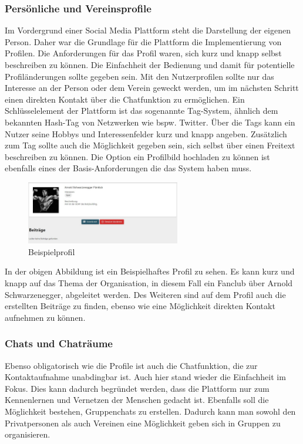 \subsubsection{Persönliche und Vereinsprofile}
\label{sec:abgeleitetefeatures}
Im Vordergrund einer Social Media Plattform steht die Darstellung der eigenen Person. Daher war die Grundlage für die Plattform die Implementierung von Profilen.
Die Anforderungen für das Profil waren, sich kurz und knapp selbst beschreiben zu können. Die Einfachheit der Bedienung und damit für potentielle Profiländerungen sollte gegeben sein. Mit den Nutzerprofilen sollte nur das Interesse an der Person oder dem Verein geweckt werden, um im nächsten Schritt einen direkten Kontakt über die Chatfunktion zu ermöglichen.
Ein Schlüsselelement der Plattform ist das sogenannte Tag-System, ähnlich dem bekannten Hash-Tag von Netzwerken wie bspw. Twitter. Über die Tags kann ein Nutzer seine Hobbys und Interessenfelder kurz und knapp angeben.
Zusätzlich zum Tag sollte auch die Möglichkeit gegeben sein, sich selbst über einen Freitext beschreiben zu können.
Die Option ein Profilbild hochladen zu können ist ebenfalls eines der Basis-Anforderungen die das System haben muss.

\begin{figure}[ht!]
    \centering
    \includegraphics[width=0.6\textwidth]{figures/andre/beispielprofil.jpg}
    \caption{Beispielprofil}
    \label{fig:beispielprofil}
\end{figure}

In der obigen Abbildung ist ein Beispielhaftes Profil zu sehen. Es kann kurz und knapp auf das Thema der Organisation, in diesem Fall ein Fanclub über Arnold Schwarzenegger, abgeleitet werden. Des Weiteren sind auf dem Profil auch die erstellten Beiträge zu finden, ebenso wie eine Möglichkeit direkten Kontakt aufnehmen zu können. 

\subsubsection{Chats und Chaträume}
Ebenso obligatorisch wie die Profile ist auch die Chatfunktion, die zur Kontaktaufnahme unabdingbar ist. 
Auch hier stand wieder die Einfachheit im Fokus. Dies kann dadurch begründet werden, dass die Plattform nur zum Kennenlernen und Vernetzen der Menschen gedacht ist.
Ebenfalls soll die Möglichkeit bestehen, Gruppenchats zu erstellen. Dadurch kann man sowohl den Privatpersonen als auch Vereinen eine Möglichkeit geben sich in Gruppen zu organisieren. 


